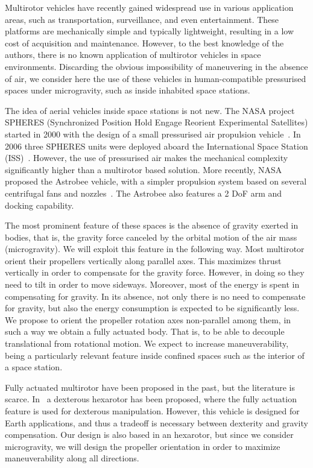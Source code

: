 
Multirotor vehicles have recently gained widespread use in various
application areas, such as transportation, surveillance, and even
entertainment. These platforms are mechanically simple and typically
lightweight, resulting in a low cost of acquisition and
maintenance. However, to the best knowledge of the authors, there is
no known application of multirotor vehicles in space
environments. Discarding the obvious impossibility of maneuvering in
the absence of air, we consider here the use of these vehicles in
human-compatible pressurised spaces under microgravity, such as inside
inhabited space stations.

The idea of aerial vehicles inside space stations is not new. The NASA
project SPHERES (Synchronized Position Hold Engage Reorient
Experimental Satellites) started in 2000 with the design of a small
pressurised air propulsion vehicle~\cite{miller00}. In 2006 three
SPHERES units were deployed aboard the International Space Station
(ISS)~\cite{nolet07}.  However, the use of pressurised air makes the
mechanical complexity significantly higher than a multirotor based
solution.  More recently, NASA proposed the Astrobee vehicle, with a
simpler propulsion system based on several centrifugal fans and
nozzles~\cite{bualat15}. The Astrobee also features a 2 DoF arm and
docking capability.

The most prominent feature of these spaces is the absence of gravity
exerted in bodies, that is, the gravity force canceled
by the orbital motion of the air mass (microgravity). We will exploit this feature in
the following way. Most multirotor orient their propellers
vertically along parallel axes. This maximizes thrust vertically in
order to compensate for the gravity force. However, in doing so they
need to tilt in order to move sideways. Moreover, most of the energy
is spent in compensating for gravity. In its absence, not
only there is no need to compensate for gravity, but also the
energy consumption is expected to be significantly less. We propose
to orient the propeller rotation axes non-parallel among them, in
such a way we obtain a fully actuated body. That is, to be able
to decouple translational from rotational motion. We expect to
increase maneuverability, being a particularly relevant feature inside
confined spaces such as the interior of a space station.

Fully actuated multirotor have been proposed in the past, but the
literature is scarce. In~\cite{jiang13,voyles12} a dexterous
hexarotor has been proposed, where the fully actuation feature is
used for dexterous manipulation. However, this vehicle is designed for
Earth applications, and thus a tradeoff is necessary between dexterity
and gravity compensation. Our design is also based in an hexarotor,
but since we consider microgravity, we will design the propeller
orientation in order to maximize maneuverability along all directions.

